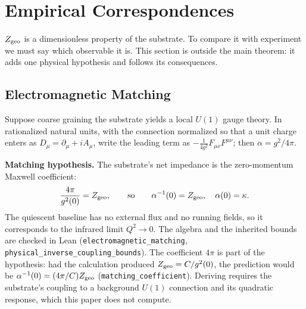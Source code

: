 
\section{Empirical Correspondences}
\label{sec:empirical_correspondences}
$Z_{\rm geo}$ is a dimensionless property of the substrate. To compare it with experiment we must say which observable it is. This section is outside the main theorem: it adds one physical hypothesis and follows its consequences.

\subsection{Electromagnetic Matching}
\label{sec:electromagnetic_matching}
Suppose coarse graining the substrate yields a local $U(1)$ gauge theory. In rationalized natural units, with the connection normalized so that a unit charge enters as $D_\mu=\partial_\mu+iA_\mu$, write the leading term as $-\frac{1}{4g^2}F_{\mu\nu}F^{\mu\nu}$; then $\alpha=g^2/4\pi$\cite{tong_qft_2007}.

\textbf{Matching hypothesis.} The substrate's net impedance is the zero-momentum Maxwell coefficient:
\begin{equation}
\label{eq:maxwell_matching}
\frac{4\pi}{g^2(0)}=Z_{\rm geo},\qquad\text{so}\qquad \alpha^{-1}(0)=Z_{\rm geo},\quad \alpha(0)=\kappa.
\end{equation}
The quiescent baseline has no external flux and no running fields, so it corresponds to the infrared limit $Q^2\to0$. The algebra and the inherited bounds are checked in Lean (\texttt{electromagnetic\_matching}, \texttt{physical\_inverse\_coupling\_bounds}). The coefficient $4\pi$ is part of the hypothesis: had the calculation produced $Z_{\rm geo}=C/g^2(0)$, the prediction would be $\alpha^{-1}(0)=(4\pi/C)Z_{\rm geo}$ (\texttt{matching\_coefficient}). Deriving  requires the substrate's coupling to a background $U(1)$ connection and its quadratic response, which this paper does not compute.

